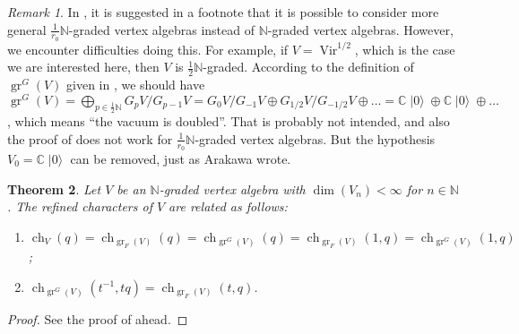 \documentclass[a4paper, 12pt, reqno]{amsart}
\newtheorem{theorem}{Theorem}[section]
\theoremstyle{remark}
\newtheorem{remark}[theorem]{Remark}
\numberwithin{equation}{subsection}
\DeclareMathOperator{\Vir}{Vir}
\DeclareMathOperator{\gr}{gr}
\DeclareMathOperator{\ch}{ch}
\DeclareMathOperator{\vac}{|0\rangle}
\begin{document}
\begin{remark}
  \label{rmk:37}
  In \cite{arakawa_remark_2012}, it is suggested in a footnote that it is possible to consider more general $\tfrac{1}{r_0}\mathbb{N}$-graded vertex algebras instead of $\mathbb{N}$-graded vertex algebras.
  However, we encounter difficulties doing this.
  For example, if $V = \Vir^{1/2}$, which is the case we are interested here, then $V$ is $\tfrac{1}{2}\mathbb{N}$-graded.
  According to the definition of $\gr^G(V)$ given in \cite{arakawa_remark_2012}, we should have $\gr^G(V) = \bigoplus_{p \in \tfrac{1}{2}\mathbb{N}}G_pV/G_{p - 1}V = G_0V/G_{-1}V \oplus G_{1/2}V/G_{-1/2}V \oplus \dots = \mathbb{C}\vac \oplus \mathbb{C}\vac \oplus \dots$, which means ``the vacuum is doubled''.
  That is probably not intended, and also the proof of \cite[Proposition 2.6.1]{arakawa_remark_2012} does not work for $\tfrac{1}{r_0}\mathbb{N}$-graded vertex algebras.
  But the hypothesis $V_0 = \mathbb{C}\vac$ can be removed, just as Arakawa wrote.
\end{remark}

\begin{theorem}
  \label{thr:48}
  Let $V$ be an $\mathbb{N}$-graded vertex algebra with $\dim(V_n) < \infty$ for $n \in \mathbb{N}$.
  The refined characters of $V$ are related as follows:
  \begin{enumerate}
  \item $\ch_V(q) = \ch_{\gr_F(V)}(q) = \ch_{\gr^G(V)}(q) = \ch_{\gr_F(V)}(1, q) = \ch_{\gr^G(V)}(1, q)$;
  \item $\ch_{\gr^G(V)}(t^{-1}, tq) = \ch_{\gr_F(V)}(t, q)$.
  \end{enumerate}
\end{theorem}

\begin{proof}
  See the proof of  ahead.
\end{proof}
\end{document}

